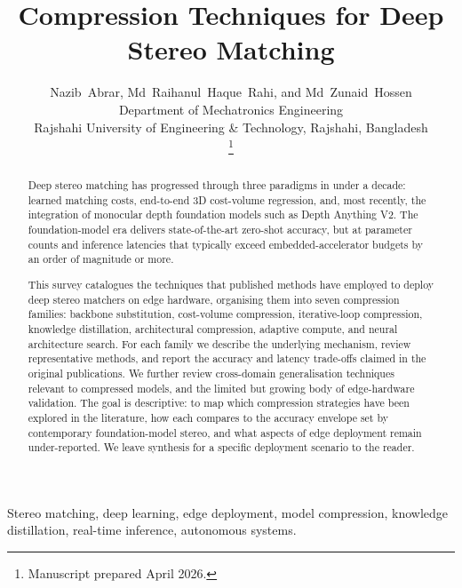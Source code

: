 \documentclass[journal]{IEEEtran}
\title{Compression Techniques for Deep Stereo Matching}
\author{
\parbox{\linewidth}{\centering
Nazib~Abrar, Md~Raihanul~Haque~Rahi, and Md~Zunaid~Hossen \\[2pt]
\small Department of Mechatronics Engineering \\
Rajshahi University of Engineering \& Technology, Rajshahi, Bangladesh}%
\thanks{Manuscript prepared April 2026.}%
}
\begin{document}
\maketitle

\begin{abstract}
Deep stereo matching has progressed through three paradigms in under a decade: learned matching costs, end-to-end 3D cost-volume regression, and, most recently, the integration of monocular depth foundation models such as Depth Anything V2. The foundation-model era delivers state-of-the-art zero-shot accuracy, but at parameter counts and inference latencies that typically exceed embedded-accelerator budgets by an order of magnitude or more.

This survey catalogues the techniques that published methods have employed to deploy deep stereo matchers on edge hardware, organising them into seven compression families: backbone substitution, cost-volume compression, iterative-loop compression, knowledge distillation, architectural compression, adaptive compute, and neural architecture search. For each family we describe the underlying mechanism, review representative methods, and report the accuracy and latency trade-offs claimed in the original publications. We further review cross-domain generalisation techniques relevant to compressed models, and the limited but growing body of edge-hardware validation. The goal is descriptive: to map which compression strategies have been explored in the literature, how each compares to the accuracy envelope set by contemporary foundation-model stereo, and what aspects of edge deployment remain under-reported. We leave synthesis for a specific deployment scenario to the reader.
\end{abstract}

\begin{IEEEkeywords}
Stereo matching, deep learning, edge deployment, model compression, knowledge distillation, real-time inference, autonomous systems.
\end{IEEEkeywords}












\end{document}
